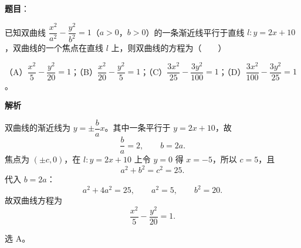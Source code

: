 \begin{answer}

\textbf{题目}：

已知双曲线 $\dfrac{x^2}{a^2}-\dfrac{y^2}{b^2}=1$（$a>0$，$b>0$）的一条渐近线平行于直线 $l:y=2x+10$，双曲线的一个焦点在直线 $l$ 上，则双曲线的方程为\mbox{（　　）}

（A）$\dfrac{x^2}{5}-\dfrac{y^2}{20}=1$；（B）$\dfrac{x^2}{20}-\dfrac{y^2}{5}=1$；（C）$\dfrac{3x^2}{25}-\dfrac{3y^2}{100}=1$；（D）$\dfrac{3x^2}{100}-\dfrac{3y^2}{25}=1$。

\textbf{解析}

双曲线的渐近线为 $y=\pm\dfrac ba x$。其中一条平行于 $y=2x+10$，故
\nopagebreak[4]
\[\frac ba=2,\qquad b=2a.\]
焦点为 $(\pm c,0)$，在 $l:y=2x+10$ 上令 $y=0$ 得 $x=-5$，所以 $c=5$，且
\nopagebreak[4]
\[a^2+b^2=c^2=25.\]
代入 $b=2a$：
\nopagebreak[4]
\[a^2+4a^2=25,\qquad a^2=5,\qquad b^2=20.\]
故双曲线方程为
\nopagebreak[4]
\[\frac{x^2}{5}-\frac{y^2}{20}=1.\]

选 A。


\end{answer}

